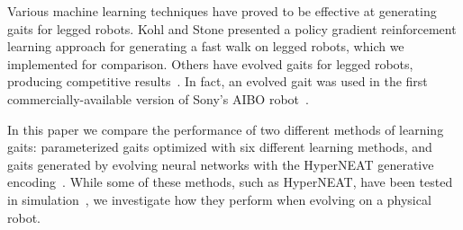 
Various machine learning techniques have proved to be effective at
generating gaits for legged robots. Kohl and Stone presented a policy
gradient reinforcement learning approach for generating a fast walk on
legged robots\cite{kohl}, which we implemented for comparison. Others
have evolved gaits for legged robots, producing competitive
results~\cite{clune2009evolving, clune2009sensitivity, hornby2005autonomous}. In
fact, an evolved gait was used in the first commercially-available
version of Sony's AIBO robot~\cite{hornby2005autonomous}.


In this paper we compare the performance of two different methods of
learning gaits: parameterized gaits optimized with six different
learning methods, and gaits generated by evolving neural networks with
the HyperNEAT generative encoding~\cite{stanley2009hypercube}. While
some of these methods, such as HyperNEAT, have been tested in
simulation~\cite{clune2009evolving}, we
investigate how they perform when evolving on a physical robot.
